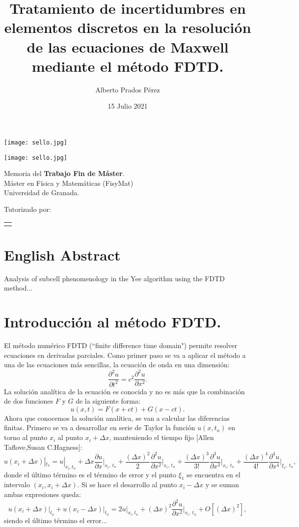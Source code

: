 \documentclass[12pt, oneside]{book}
\title{Tratamiento de incertidumbres en elementos discretos en la resolución de las ecuaciones de Maxwell mediante el método FDTD.}
\author{Alberto Prados Pérez}
\date{15 Julio 2021}
\makeatletter
\renewcommand\maketitle{%
  \begin{titlepage}
      \vspace*{1.5cm}
      \parskip=0pt
      \Huge\bfseries
      \begin{center}
          \leavevmode\texttt{[image: sello.jpg]}\\[2cm]
          \@title
      \end{center}
      \vspace{1cm}
      \begin{center}
          \@author
      \end{center}
  \end{titlepage}
  
  \begin{titlepage}
  \parindent=0pt
  \begin{flushleft}
  \vspace*{1.5mm}
  \setlength\baselineskip{0pt}
  \setlength\parskip{0mm}
  \begin{center}
      \leavevmode\texttt{[image: sello.jpg]}
  \end{center}
  \end{flushleft}
  \vspace{1cm}
  \bgroup
  \Large \bfseries
  \begin{center}
  \@title
  \end{center}
  \egroup
  \vspace*{.5cm}
  \begin{center}
  \@author
  \end{center}
  \vspace*{1.8cm}
  \begin{flushright}
  \begin{minipage}{8.45cm}
      Memoria del {\bf Trabajo Fin de Máster}.\\ 
      Máster en Física y Matemáticas (FisyMat) \\ 
      Universidad de Granada.

      \vspace*{7.5mm}

      Tutorizado por:
  \end{minipage}\par
  \begin{tabularx}{8.45cm}[b]{@{}l}
      \guardatutores
  \end{tabularx}
   \end{flushright}
      \vspace*{\fill}
   \end{titlepage}
   \pagestyle{tfg}
   \renewcommand{\chaptermark}[1]{\markright{\thechapter.\space ##1}}
   \renewcommand{\sectionmark}[1]{}
   \renewcommand{\subsectionmark}[1]{}
  }
\makeatother
\begin{document}
\maketitle

\frontmatter
\tableofcontents

\mainmatter

\chapter*{English Abstract}



\begin{otherlanguage}{english}
    Analysis of subcell phenomenology in the Yee algorithm using the FDTD method...
\end{otherlanguage}



\chapter{Introducción al método FDTD.}

El método numérico FDTD (``finite difference time domain") permite resolver ecuaciones en derivadas parciales. Como primer paso se va a aplicar el método a una de las ecuaciones más sencillas, la ecuación de onda en una dimensión:
\begin{equation}
\frac{\partial^2 u}{\partial t^2}= c^2 \frac{\partial^2 u}{\partial x^2}.
\end{equation}
La solución analítica de la ecuación  es conocida y no es más que la combinación de dos funciones $F$ y $G$ de la siguiente forma:
\begin{equation}
u(x,t)= F(x+ct)+G(x-ct).
\end{equation}
\indent Ahora que conocemos la solución analítica, se van a calcular las diferencias finitas. Primero se va a desarrollar en serie de Taylor la función $u(x,t_n)$ en torno al punto $x_i$ al punto $x_i+\Delta x$, manteniendo el tiempo fijo [Allen Taflove,Susan C.Hagness]:
\begin{equation}
u(x_i+\Delta x)|_{t_n} = u|_{x_i,t_n} + \Delta x \frac{\partial u}{\partial x} \bigg |_{x_i,\: t_n} + \frac{\left(\Delta x\right)^2}{2}\frac{\partial^2 u}{\partial x^2}\bigg |_{x_i,\: t_n} +\frac{\left(\Delta x\right)^3}{3!}\frac{\partial^3 u}{\partial x^3}\bigg |_{x_i,\: t_n} + \frac{\left(\Delta x\right)^4}{4!}\frac{\partial^4 u}{\partial x^4}\bigg |_{\xi_1,\: t_n},
\end{equation} 
donde el último término es el término de error y el punto $\xi_1$ se encuentra en el intervalo $(x_i, x_i+\Delta x)$. Si se hace el desarrollo al punto $x_i - \Delta x$ y se suman ambas expresiones queda:
\begin{equation}
u(x_i+\Delta x) \bigg |_{t_n}+u(x_i-\Delta x) \bigg |_{t_n}=2u|_{x_i,t_n}+\left(\Delta x\right)^2\frac{\partial^2 u}{\partial x^2}\bigg |_{x_i,\: t_n} + O\left[ \left( \Delta x\right)^2\right],
\end{equation}
siendo el último término el error...
\end{document}
